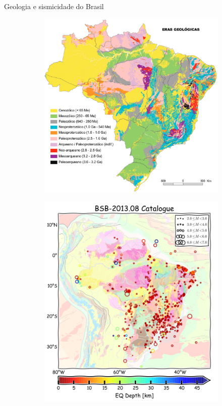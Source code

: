 \documentclass[ucs,8pt]{beamer}
\begin{document}
\begin{frame}{Geologia e sismicidade do Brasil}
\begin{figure}[H]
	\scriptsize
	\centering
	\begin{subfigure}[T]{0.48\textwidth}
	  \centering
	  \includegraphics[width=1.0\textwidth]{tectonico_brasil} 
	  \label{fig:br_tec} 
	\end{subfigure}
	\begin{subfigure}[T]{0.48\textwidth}
	  \centering
	  \includegraphics[width=1.0\textwidth]{seismicity_br} 

\end{subfigure}
\end{figure}
\end{frame}
\end{document}
